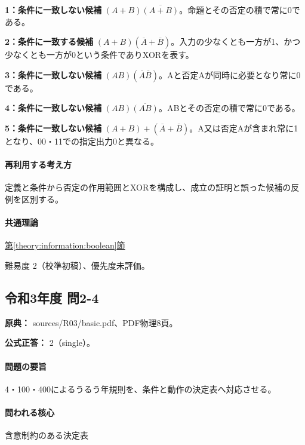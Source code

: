 \noindent\textbf{1：条件に一致しない候補} \((A+B)\overline{(A+B)}\)。命題とその否定の積で常に0である。\par

\noindent\textbf{2：条件に一致する候補} \((A+B)(\overline A+\overline B)\)。入力の少なくとも一方が1、かつ少なくとも一方が0という条件でありXORを表す。\par

\noindent\textbf{3：条件に一致しない候補} \((AB)(\overline A\overline B)\)。Aと否定Aが同時に必要となり常に0である。\par

\noindent\textbf{4：条件に一致しない候補} \((AB)\overline{(AB)}\)。ABとその否定の積で常に0である。\par

\noindent\textbf{5：条件に一致しない候補} \((A+B)+(\overline A+\overline B)\)。A又は否定Aが含まれ常に1となり、00・11での指定出力0と異なる。\par

\paragraph{再利用する考え方} 定義と条件から否定の作用範囲とXORを構成し、成立の証明と誤った候補の反例を区別する。

\paragraph{共通理論} \hyperref[theory:information:boolean]{第\ref*{theory:information:boolean}節}

\par 難易度 2（校準初稿）、優先度未評価。

\subsection{令和3年度 問2-4}
\label{q:r03-reg-basic-2-4}

\noindent\textbf{原典：} sources/R03/basic.pdf、PDF物理8頁。

\textbf{公式正答：} 2（single）。

\paragraph{問題の要旨} 4・100・400によるうるう年規則を、条件と動作の決定表へ対応させる。

\paragraph{問われる核心} 含意制約のある決定表

